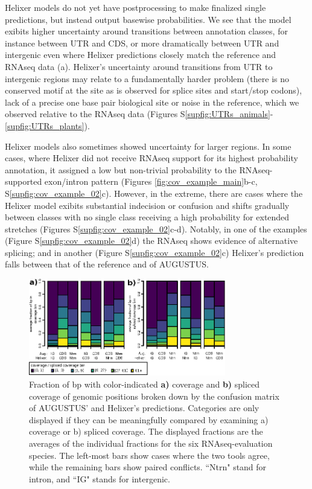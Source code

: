 \documentclass{bioinfo}
\newcounter{supfig}
\begin{document}
Helixer models do not yet have postprocessing
to make finalized single predictions, but instead output basewise probabilities.
We see that the model exibits higher uncertainty around transitions between annotation 
classes, for instance between UTR and CDS, or more dramatically between UTR and 
intergenic even where Helixer predictions closely match the reference and RNAseq data (a). 
Helixer's uncertainty around transitions from UTR to intergenic regions may relate to a
fundamentally harder problem (there is no conserved motif at the site as is observed
for splice sites and start/stop codons), lack of a precise one 
base pair biological site \citep{carninci2006genome,hon2013quantification}
or noise in the reference, which we observed relative to the RNAseq data 
(Figures S\ref{supfig:UTRs_animals}-\ref{supfig:UTRs_plants}). %

Helixer models also sometimes showed uncertainty for larger regions.
In some cases, where Helixer did not receive RNAseq support for its highest probability
annotation, it assigned a low but non-trivial probability to the RNAseq-supported 
exon/intron pattern (Figures \ref{fig:cov_example_main}b-c, S\ref{supfig:cov_example_02}c). However, in the extreme,
there are cases where the Helixer model exibits substantial indecision or confusion 
and shifts gradually between classes with no single class receiving a high probability 
for extended stretches (Figures S\ref{supfig:cov_example_02}c-d). 
Notably, in one of the examples (Figure S\ref{supfig:cov_example_02}d)
the RNAseq shows evidence of alternative splicing; 
and in another (Figure S\ref{supfig:cov_example_02}c) Helixer's
prediction falls between that of the reference and of AUGUSTUS.

\begin{figure}[hbt]
\label{fig:average_vs_augustus}
\includegraphics[width=8.6cm]{images/cov_examples/average_vs_augustus}  %
\caption{Fraction of bp with color-indicated {\bf a)} coverage and {\bf b)} spliced coverage of genomic positions 
broken down by the confusion matrix of AUGUSTUS' and Helixer's predictions. Categories 
are only displayed if they can be meaningfully compared by examining a) coverage or b) spliced
coverage. The displayed fractions are the averages of the individual fractions for the 
six RNAseq-evaluation species. The left-most bars show cases where the two tools agree, 
while the remaining bars show paired conflicts. ``Ntrn" stand
for intron, and ``IG" stands for intergenic.}
\end{figure}
\end{document}
